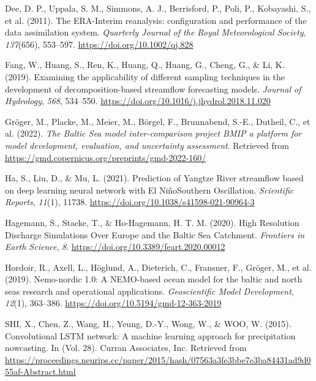 \documentclass[
]{agujournal2019}
\newlength{\cslhangindent}
\newlength{\cslentryspacingunit} %
\newenvironment{CSLReferences}[2] %
 {%
  \setlength{\parindent}{0pt}
  \ifodd #1
  \let\oldpar\par
  \def\par{\hangindent=\cslhangindent\oldpar}
  \fi
  \setlength{\parskip}{#2\cslentryspacingunit}
 }%
 {}
\begin{document}
\hypertarget{refs}{}
\begin{CSLReferences}{1}{0}
\vspace{1em}

\leavevmode{}%
Dee, D. P., Uppala, S. M., Simmons, A. J., Berrisford, P., Poli, P.,
Kobayashi, S., et al. (2011). The ERA-Interim reanalysis: configuration
and performance of the data assimilation system. \emph{Quarterly Journal
of the Royal Meteorological Society}, \emph{137}(656), 553--597.
\url{https://doi.org/10.1002/qj.828}

\leavevmode{}%
Fang, W., Huang, S., Ren, K., Huang, Q., Huang, G., Cheng, G., \& Li, K.
(2019). Examining the applicability of different sampling techniques in
the development of decomposition-based streamflow forecasting models.
\emph{Journal of Hydrology}, \emph{568}, 534--550.
\url{https://doi.org/10.1016/j.jhydrol.2018.11.020}

\leavevmode{}%
Gröger, M., Placke, M., Meier, M., Börgel, F., Brunnabend, S.-E.,
Dutheil, C., et al. (2022). \emph{The Baltic Sea model inter-comparison
project BMIP {\textendash} a platform for model development, evaluation,
and uncertainty assessment}. Retrieved from
\url{https://gmd.copernicus.org/preprints/gmd-2022-160/}

\leavevmode{}%
Ha, S., Liu, D., \& Mu, L. (2021). Prediction of Yangtze River
streamflow based on deep learning neural network with El
Niño{\textendash}Southern Oscillation. \emph{Scientific Reports},
\emph{11}(1), 11738. \url{https://doi.org/10.1038/s41598-021-90964-3}

\leavevmode{}%
Hagemann, S., Stacke, T., \& Ho-Hagemann, H. T. M. (2020). High
{Resolution Discharge Simulations Over Europe} and the {Baltic Sea
Catchment}. \emph{Frontiers in Earth Science}, \emph{8}.
\url{https://doi.org/10.3389/feart.2020.00012}

\leavevmode{}%
Hordoir, R., Axell, L., Höglund, A., Dieterich, C., Fransner, F.,
Gröger, M., et al. (2019). Nemo-nordic 1.0: A NEMO-based ocean model for
the baltic and north seas {\textendash} research and operational
applications. \emph{Geoscientific Model Development}, \emph{12}(1),
363--386. \url{https://doi.org/10.5194/gmd-12-363-2019}

\leavevmode{}%
SHI, X., Chen, Z., Wang, H., Yeung, D.-Y., Wong, W., \& WOO, W. (2015).
Convolutional LSTM network: A machine learning approach for
precipitation nowcasting. In (Vol. 28). Curran Associates, Inc.
Retrieved from
\url{https://proceedings.neurips.cc/paper/2015/hash/07563a3fe3bbe7e3ba84431ad9d055af-Abstract.html}


\end{CSLReferences}
\end{document}
